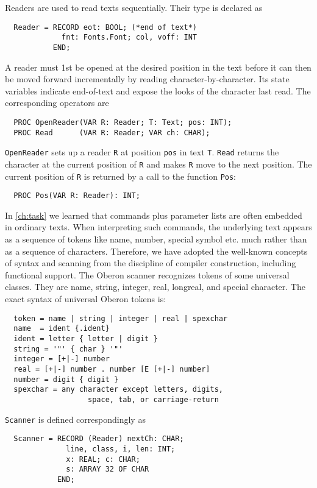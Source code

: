 Readers are used to read texts sequentially. Their type is declared as
\begin{verbatim}
  Reader = RECORD eot: BOOL; (*end of text*)
             fnt: Fonts.Font; col, voff: INT
           END;
\end{verbatim}

A reader must 1st be opened at the desired position in the text
before it can then be moved forward incrementally by reading character-by-character.
Its state variables indicate end-of-text and expose the looks of the character last read.
The corresponding operators are
\begin{verbatim}
  PROC OpenReader(VAR R: Reader; T: Text; pos: INT);
  PROC Read      (VAR R: Reader; VAR ch: CHAR);
\end{verbatim}

\verb|OpenReader| sets up a reader \verb|R| at position \verb|pos| in text \verb|T|.
\verb|Read| returns the character at the current position of \verb|R|
and makes \verb|R| move to the next position.
The current position of \verb|R| is returned by a call to the function \verb|Pos|:
\begin{verbatim}
  PROC Pos(VAR R: Reader): INT;
\end{verbatim}

In \ref{ch:task} we learned that commands plus parameter lists are often embedded in ordinary texts.
When interpreting such commands, the underlying text appears as a sequence of tokens like name,
number, special symbol etc. much rather than as a sequence of characters.  Therefore,
we have adopted the well-known concepts of syntax and scanning from the discipline
of compiler construction, including functional support.
The Oberon scanner recognizes tokens of some universal classes.
They are name, string, integer, real, longreal, and special character.
The exact syntax of universal Oberon tokens is:
\begin{verbatim}
  token = name | string | integer | real | spexchar
  name  = ident {.ident}
  ident = letter { letter | digit }
  string = '"' { char } '"'
  integer = [+|-] number
  real = [+|-] number . number [E [+|-] number]
  number = digit { digit }
  spexchar = any character except letters, digits,
                   space, tab, or carriage-return
\end{verbatim}
\verb|Scanner| is defined correspondingly as
\begin{verbatim}
  Scanner = RECORD (Reader) nextCh: CHAR;
              line, class, i, len: INT;
              x: REAL; c: CHAR;
              s: ARRAY 32 OF CHAR
            END;
\end{verbatim}

